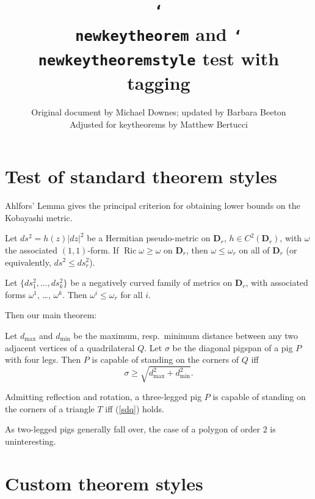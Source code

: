 \documentclass{article}
\title{\texttt{\char`\\ newkeytheorem} and \texttt{\char`\\ newkeytheoremstyle} test with tagging}
\author{%
  Original document by Michael Downes; updated by Barbara Beeton\\
  Adjusted for \textsf{keytheorems} by Matthew Bertucci
  }
\let\lvert=|\let\rvert=|
\newcommand{\Ric}{\mathop{\mathrm{Ric}}\nolimits}
\begin{document}
\maketitle

\section{Test of standard theorem styles}

Ahlfors' Lemma gives the principal criterion for obtaining lower bounds
on the Kobayashi metric.

\begin{Ahlfors}
Let $ds^2 = h(z)\lvert dz\rvert^2$ be a Hermitian pseudo-metric on
$\mathbf{D}_r$, $h\in C^2(\mathbf{D}_r)$, with $\omega$ the associated
$(1,1)$-form. If $\Ric\omega\geq\omega$ on $\mathbf{D}_r$,
then $\omega\leq\omega_r$ on all of $\mathbf{D}_r$ (or equivalently,
$ds^2\leq ds_r^2$).
\end{Ahlfors}

\begin{lem}
Let $\{ds_1^2,\dots,ds_k^2\}$ be a negatively curved family of metrics
on $\mathbf{D}_r$, with associated forms $\omega^1$, \dots, $\omega^k$.
Then $\omega^i \leq\omega_r$ for all $i$.
\end{lem}

Then our main theorem:
\begin{thm}\label{pigspan} %
Let $d_{\max}$ and $d_{\min}$ be the maximum, resp.\ minimum distance
between any two adjacent vertices of a quadrilateral $Q$. Let $\sigma$
be the diagonal pigspan of a pig $P$ with four legs.
Then $P$ is capable of standing on the corners of $Q$ iff
\begin{equation}\label{sdq}
\sigma\geq \sqrt{d_{\max}^2+d_{\min}^2}.
\end{equation}
\end{thm}

\begin{cor}
Admitting reflection and rotation, a three-legged pig $P$ is capable of
standing on the corners of a triangle $T$ iff (\ref{sdq}) holds.
\end{cor}

\begin{rmk}
As two-legged pigs generally fall over, the case of a polygon of order
$2$ is uninteresting.
\end{rmk}

\section{Custom theorem styles}
\end{document}
